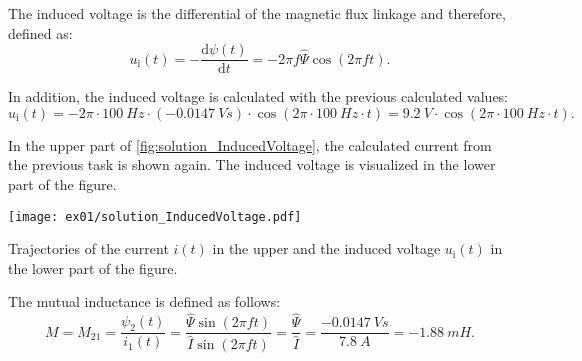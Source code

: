 
\begin{solutionblock}
    The induced voltage is the differential of the magnetic flux linkage and therefore, defined as:
    \begin{equation}
        u_{\mathrm{i}}(t) = -\frac{\mathrm{d}\psi(t)}{\mathrm{d}t}
        = - 2 \pi f \mathit{\hat{\Psi}} \cos(2 \pi f t).
    \end{equation}

    In addition, the induced voltage is calculated with the previous calculated values:
    \begin{equation}
        u_{\mathrm{i}}(t) = -2 \pi \cdot 100 \ \si{Hz} \cdot (-0.0147 \ \si{Vs}) \cdot \cos(2 \pi \cdot 100 \ \si{Hz} \cdot t)
        = 9.2 \ \si{V} \cdot \cos(2 \pi \cdot 100 \ \si{Hz} \cdot t).
    \end{equation}

    In the upper part of \autoref{fig:solution_InducedVoltage}, the calculated current from the previous task is shown again. The induced voltage is visualized in the lower part of the figure. 
    \begin{solutionfigure}[ht]
        \centering
        \texttt{[image: ex01/solution\_InducedVoltage.pdf]}
        \caption{Trajectories of the current $i(t)$ in the upper and the induced voltage $u_{\mathrm{i}}(t)$ in the lower part of the figure.}
        \label{fig:solution_InducedVoltage}
    \end{solutionfigure}
    
\end{solutionblock}




\begin{solutionblock}
   The mutual inductance is defined as follows:
    \begin{equation}
        M = M_{\mathrm{21}} = \frac{\psi_{\mathrm{2}}(t)}{i_{\mathrm{1}}(t)}
        = \frac{\mathit{\hat{\Psi}} \sin(2 \pi f t)}{\hat{I} \sin(2 \pi f t)}
        = \frac{\mathit{\hat{\Psi}}}{\hat{I}}
        = \frac{-0.0147 \ \si{Vs}}{7.8 \ \si{A}}
        = -1.88 \ \si{mH}.
    \end{equation}

\end{solutionblock}





